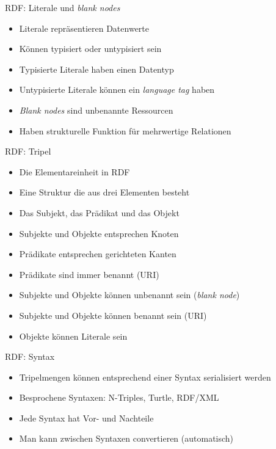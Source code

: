 \documentclass{beamer}
\begin{document}
\begin{frame}{RDF: Literale und \emph{blank nodes}}
	
	\begin{itemize}
		\item Literale repräsentieren Datenwerte
		\item Können typisiert oder untypisiert sein
		\item Typisierte Literale haben einen Datentyp
		\item Untypisierte Literale können ein \emph{language tag} haben
		\item \emph{Blank nodes} sind unbenannte Ressourcen
		\item Haben strukturelle Funktion für mehrwertige Relationen
	\end{itemize}
	
\end{frame}

\begin{frame}{RDF: Tripel}
	
	\begin{itemize}
		\item Die Elementareinheit in RDF
		\item Eine Struktur die aus drei Elementen besteht
		\item Das Subjekt, das Prädikat und das Objekt
		\item Subjekte und Objekte entsprechen Knoten 
		\item Prädikate entsprechen gerichteten Kanten
		\item Prädikate sind immer benannt (URI)
		\item Subjekte und Objekte können unbenannt sein (\emph{blank node})
		\item Subjekte und Objekte können benannt sein (URI)
		\item Objekte können Literale sein
	\end{itemize}
	
\end{frame}

\begin{frame}{RDF: Syntax}
	
	\begin{itemize}
		\item Tripelmengen können entsprechend einer Syntax serialisiert werden
		\item Besprochene Syntaxen: N-Triples, Turtle, RDF/XML
		\item Jede Syntax hat Vor- und Nachteile
		\item Man kann zwischen Syntaxen convertieren (automatisch)
	\end{itemize}
	
\end{frame}
\end{document}
